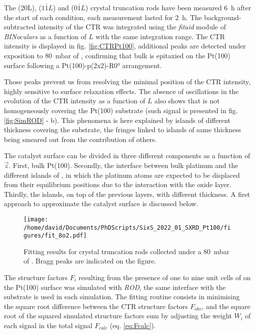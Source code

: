 The (20L), ($1\bar{1}L$) and (0$\bar{1}L$) crystal truncation rods have been measured \qty{6}{\hour} after the start of each condition, each measurement lasted for \qty{2}{\hour}.
The background-subtracted intensity of the CTR was integrated using the \textit{fitaid} module of \textit{BINoculars} as a function of $L$ with the same integration range.
The CTR intensity is displayed in fig. \ref{fig:CTRPt100}, additional peaks are detected under exposition to \qty{80}{\milli\bar} of , confirming that bulk  is epitaxied on the Pt(100) surface following a Pt(100)-p(2x2)-R\ang{0} arrangement.

Those peaks prevent us from resolving the minimal position of the CTR intensity, highly sensitive to surface relaxation effects.
The absence of oscillations in the evolution of the CTR intensity as a function of $L$ also shows that  is not homogeneously covering the Pt(100) substrate (such signal is presented in fig. \ref{fig:SimROD} - b).
This phenomena is here explained by  islands of different thickness covering the substrate, the fringes linked to islands of same thickness being smeared out from the contribution of others.

The catalyst surface can be divided in three different components as a function of $\vec{z}$.
First, bulk Pt(100).
Secondly, the interface between bulk platinum and the different islands of , in which the platinum atoms are expected to be displaced from their equilibrium positions due to the interaction with the oxide layer.
Thirdly, the  islands, on top of the previous layers, with different thickness.
A first approach to approximate the catalyst surface is discussed below.

\begin{figure}[!htb]
    \centering
    \texttt{[image: /home/david/Documents/PhDScripts/SixS\_2022\_01\_SXRD\_Pt100/figures/fit\_8o2.pdf]}
    \caption{
        Fitting results for crystal truncation rods collected under a \qty{80}{\milli\bar} of .
         Bragg peaks are indicated on the figure.
    }
    \label{fig:CTRFitHighOxygen}
\end{figure}

The structure factors $F_i$ resulting from the presence of one to nine unit cells of  on the Pt(100) surface was simulated with \textit{ROD}, the same interface with the substrate is used in each simulation.
The fitting routine consists in minimising the square root difference between the CTR structure factors $F_{obs}$, and the square root of the squared simulated structure factors sum by adjusting the weight $W_i$ of each signal in the total signal $F_{calc}$ (eq. \ref{eq:Fcalc}).

